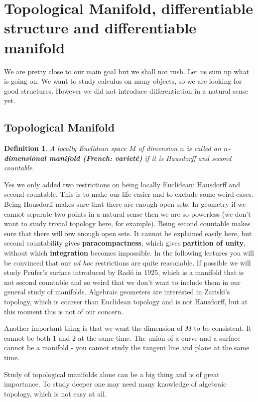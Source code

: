 \documentclass[twoside]{article}
\newtheorem{definition}{Definition}
\begin{document}
		\section{Topological Manifold, differentiable structure and differentiable manifold}
		We are pretty close to our main goal but we shall not rush. Let us sum up what is going on. We want to study calculus on many objects, so we are looking for good structures. However we did not introduce differentiation in a natural sense yet. 
			\subsection{Topological Manifold}
			\begin{definition}
				A locally Euclidean space $M$ of dimension $n$ is called an \textbf{$n$-dimensional manifold (French: varieté)} if it is Hausdorff and second countable.
			\end{definition}
			Yes we only added two restrictions on being locally Euclidean: Hausdorff and second countable. This is to make our life easier and to exclude some weird cases. Being Hausdorff makes sure that there are enough open sets. In geometry if we cannot separate two points in a natural sense then we are so powerless (we don't want to study trivial topology here, for example). Being second countable makes sure that there will few enough open sets. It cannot be explained easily here, but second countability gives \textbf{paracompactness}, which gives \textbf{partition of unity}, without which \textbf{integration} becomes impossible. In the following lectures you will be convinced that our \textit{ad hoc} restrictions are quite reasonable. If possible we will study Prüfer's surface introduced by Radó in 1925, which is a manifold that is not second countable and  so weird that we don't want to include them in our general study of manifolds. Algebraic geometers are interested in Zariski's topology, which is coarser than Euclidean topology and is not Hausdorff, but at this moment this is not of our concern.
			
			Another important thing is that we want the dimension of $M$ to be consistent. It cannot be both $1$ and $2$ at the same time. The union of a curve and a surface cannot be a manifold - you cannot study the tangent line and plane at the same time.  
			
			Study of topological manifolds alone can be a big thing and is of great importance. To study deeper one may need many knowledge of algebraic topology, which is not easy at all.
\end{document}
